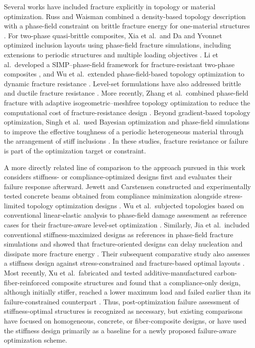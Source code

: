 \documentclass[
	pdflatex,
	sn-mathphys-num
]{sn-jnl}
\theoremstyle{thmstyleone}%
\theoremstyle{thmstyletwo}%
\theoremstyle{thmstylethree}%
\begin{document}
Several works have  included fracture explicitly in
topology or material optimization. Russ and Waisman combined a
density-based topology description with a phase-field
constraint on brittle fracture energy for one-material
structures \cite{russ_topology_2019}. For two-phase
quasi-brittle composites, Xia et al.\ and Da and Yvonnet
optimized inclusion layouts using phase-field fracture
simulations, including extensions to periodic structures and
multiple loading objectives
\cite{xia_topology_2018,da_topology_2020}. Li et al.\ developed
a SIMP--phase-field framework for fracture-resistant two-phase
composites \cite{li_simp_2021}, and Wu et al.\ extended
phase-field-based topology optimization to dynamic fracture
resistance \cite{wu_topology_2022}. Level-set formulations have
also addressed brittle and ductile fracture resistance
\cite{noii_levelset_2023}. More recently, Zhang et al.\
combined phase-field fracture with adaptive
isogeometric--meshfree topology optimization to reduce the
computational cost of fracture-resistance design
\cite{zhang_adaptive_2024}. Beyond gradient-based topology
optimization, Singh et al.\ used Bayesian optimization and
phase-field simulations to improve the effective toughness of a
periodic heterogeneous material through the arrangement of
stiff inclusions \cite{singh_optimization_2023}. In these
studies, fracture resistance or failure is part of the
optimization target or constraint.

A more directly related line of comparison to the approach pursued in this work
 considers
stiffness- or compliance-optimized designs first and evaluates
their failure response afterward. Jewett and Carstensen
constructed and experimentally tested concrete beams
obtained from compliance minimization alongside stress-limited
topology optimization designs
\cite{jewett_topology_2019}. Wu et al.\ subjected topologies
based on conventional linear-elastic analysis to phase-field
damage assessment as reference cases for their fracture-aware
level-set optimization \cite{wu_pathdependent_2021}. Similarly,
Jia et al.\ included conventional stiffness-maximized designs as
references in phase-field fracture simulations and showed that
fracture-oriented designs can delay nucleation and dissipate
more fracture energy \cite{jia_controlling_2023}. Their
subsequent comparative study also assesses a stiffness design
against stress-constrained and fracture-based optimal layouts
\cite{jia_stress_2025}. Most recently, Xu et al.\ fabricated and
tested additive-manufactured carbon-fiber-reinforced composite
structures and found that a compliance-only design, although
initially stiffer, reached a lower maximum load and failed
earlier than its failure-constrained counterpart
\cite{xu_topology_2026}. Thus, post-optimization failure
assessment of stiffness-optimal structures is recognized as
necessary, but existing comparisons have focused on homogeneous,
concrete, or fiber-composite designs, or have used the stiffness
design primarily as a baseline for a newly proposed
failure-aware optimization scheme.
\end{document}
